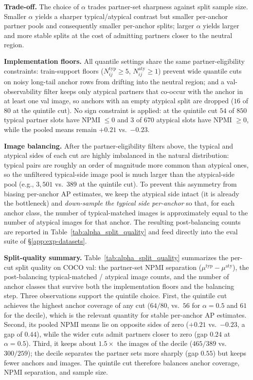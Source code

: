 \noindent\textbf{Trade-off.}
The choice of $\alpha$ trades partner-set sharpness against split
sample size. Smaller $\alpha$ yields a sharper typical/atypical
contrast but smaller per-anchor partner pools and consequently
smaller per-anchor splits; larger $\alpha$ yields larger and more
stable splits at the cost of admitting partners closer to the
neutral region.

\noindent\textbf{Implementation floors.}
All quantile settings share the same partner-eligibility constraints: 
train-support floors ($N_{ij}^{\text{typ}} \geq 5$, $N_{ij}^{\text{aty}} \geq 1$) prevent wide quantile cuts on noisy long-tail anchor rows from drifting into the neutral region; and a val-observability filter keeps only atypical partners that co-occur with the anchor in at least one val image, so anchors with an empty atypical split are dropped ($16$ of $80$ at the quintile cut). No sign constraint is applied: at the quintile cut $54$ of $850$ typical partner slots have NPMI $\leq 0$ and $3$ of $670$ atypical slots have NPMI $\geq 0$, while the pooled means remain $+0.21$ vs.\ $-0.23$.

\noindent\textbf{Image balancing.}
After the partner-eligibility filters above, the typical and atypical sides of each cut are highly imbalanced in the natural distribution: typical pairs are roughly an order of magnitude more common than atypical ones, so the unfiltered typical-side image pool is much larger than the atypical-side pool (e.g., $3{,}501$ vs.\ $389$ at the quintile cut). To prevent this asymmetry from biasing per-anchor AP estimates, we keep the atypical side intact (it is already the bottleneck) and \emph{down-sample the typical side per-anchor} so that, for each anchor class, the number of typical-matched images is approximately equal to the number of atypical images for that anchor. The resulting post-balancing counts are reported in Table~\ref{tab:alpha_split_quality} and feed directly into the eval suite of \S\ref{app:exp-datasets}. 

\noindent\textbf{Split-quality summary.}
Table~\ref{tab:alpha_split_quality} summarizes the per-cut split quality on COCO val: the partner-set NPMI separation ($\mu^{\text{typ}} - \mu^{\text{aty}}$), the post-balancing typical-matched / atypical image counts, and the number of anchor classes that survive both the implementation floors and the balancing step. Three observations support the quintile choice. First, the quintile cut achieves the highest anchor coverage of any cut ($64/80$, vs.\ $56$ for $\alpha=0.5$ and $61$ for the decile), which is the relevant quantity for stable per-anchor AP estimates.
Second, its pooled NPMI means lie on opposite sides of zero ($+0.21$ vs.\ $-0.23$, a gap of $0.44$), while the wider cuts admit partners closer to zero (gap $0.24$ at $\alpha = 0.5$). Third, it keeps about $1.5\times$ the images of the decile ($465 / 389$ vs.\ $300 / 259$); the decile separates the partner sets more sharply (gap $0.55$) but keeps fewer anchors and images. The quintile cut therefore balances anchor coverage, NPMI separation, and sample size.

